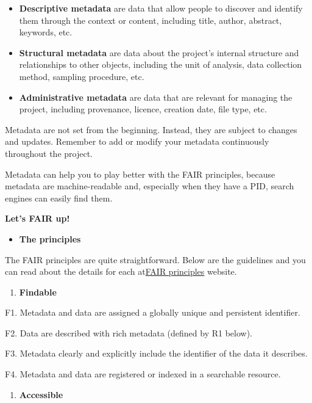 \documentclass[
]{book}
\providecommand{\tightlist}{%
  \setlength{\itemsep}{0pt}\setlength{\parskip}{0pt}}
\begin{document}
\begin{itemize}
\item
  \textbf{Descriptive metadata} are data that allow people to discover and identify them through the context or content, including title, author, abstract, keywords, etc.
\item
  \textbf{Structural metadata} are data about the project's internal structure and relationships to other objects, including the unit of analysis, data collection method, sampling procedure, etc.
\item
  \textbf{Administrative metadata} are data that are relevant for managing the project, including provenance, licence, creation date, file type, etc.
\end{itemize}

Metadata are not set from the beginning. Instead, they are subject to changes and updates. Remember to add or modify your metadata continuously throughout the project.

Metadata can help you to play better with the FAIR principles, because metadata are machine-readable and, especially when they have a PID, search engines can easily find them.

\textbf{Let's FAIR up!}

\begin{itemize}
\tightlist
\item
  \textbf{The principles}
\end{itemize}

The FAIR principles are quite straightforward. Below are the guidelines and you can read about the details for each at\href{https://www.go-fair.org/fair-principles/}{FAIR principles} website.

\begin{enumerate}
\def\labelenumi{\arabic{enumi}.}
\tightlist
\item
  \textbf{Findable}
\end{enumerate}

F1. Metadata and data are assigned a globally unique and persistent identifier.

F2. Data are described with rich metadata (defined by R1 below).

F3. Metadata clearly and explicitly include the identifier of the data it describes.

F4. Metadata and data are registered or indexed in a searchable resource.

\begin{enumerate}
\def\labelenumi{\arabic{enumi}.}
\tightlist
\item
  \textbf{Accessible}
\end{enumerate}
\end{document}
